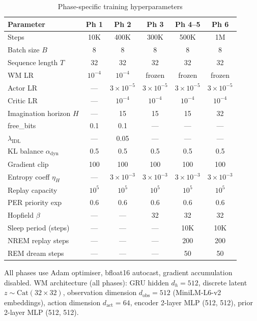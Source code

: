 \documentclass[journal,onecolumn,11pt]{IEEEtran}
\begin{document}
\begin{table}[h]
  \caption{Phase-specific training hyperparameters}
  \label{tab:hyperparams}
  \centering\small
  \begin{tabular}{lccccc}
    \toprule
    Parameter & Ph 1 & Ph 2 & Ph 3 & Ph 4--5 & Ph 6 \\
    \midrule
    Steps & 10K & 400K & 300K & 500K & 1M \\
    Batch size $B$ & 8 & 8 & 8 & 8 & 8 \\
    Sequence length $T$ & 32 & 32 & 32 & 32 & 32 \\
    WM LR & $10^{-4}$ & $10^{-4}$ & frozen & frozen & frozen \\
    Actor LR & — & $3\!\times\!10^{-5}$ & $3\!\times\!10^{-5}$ & $3\!\times\!10^{-5}$ & $3\!\times\!10^{-5}$ \\
    Critic LR & — & $10^{-4}$ & $10^{-4}$ & $10^{-4}$ & $10^{-4}$ \\
    Imagination horizon $H$ & — & 15 & 15 & 15 & 32 \\
    free\_bits & 0.1 & 0.1 & — & — & — \\
    $\lambda_{\text{IDL}}$ & — & 0.05 & — & — & — \\
    KL balance $\alpha_{\text{dyn}}$ & 0.5 & 0.5 & 0.5 & 0.5 & 0.5 \\
    Gradient clip & 100 & 100 & 100 & 100 & 100 \\
    Entropy coeff $\eta_H$ & — & $3\!\times\!10^{-3}$ & $3\!\times\!10^{-3}$ & $3\!\times\!10^{-3}$ & $3\!\times\!10^{-3}$ \\
    Replay capacity & $10^5$ & $10^5$ & $10^5$ & $10^5$ & $10^5$ \\
    PER priority exp & 0.6 & 0.6 & 0.6 & 0.6 & 0.6 \\
    Hopfield $\beta$ & — & — & 32 & 32 & 32 \\
    Sleep period (steps) & — & — & — & 10K & 10K \\
    NREM replay steps & — & — & — & 200 & 200 \\
    REM dream steps & — & — & — & 50 & 50 \\
    \bottomrule
  \end{tabular}
\end{table}

All phases use Adam optimiser, bfloat16 autocast, gradient accumulation disabled.
WM architecture (all phases): GRU hidden $d_h{=}512$, discrete latent $z\sim\text{Cat}(32\times32)$,
observation dimension $d_{\text{obs}}{=}512$ (MiniLM-L6-v2 embeddings),
action dimension $d_{\text{act}}{=}64$, encoder 2-layer MLP (512, 512), prior 2-layer MLP (512, 512).
\end{document}
